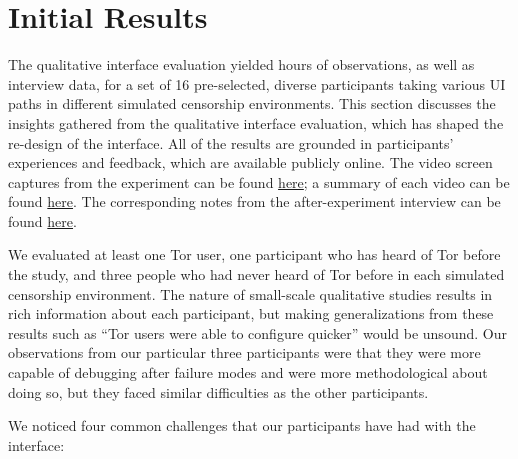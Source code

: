 \documentclass{template}
\begin{document}
\section{Initial Results}

The qualitative interface evaluation yielded hours of observations, as well as
interview data, for a set of 16 pre-selected, diverse participants taking
various UI paths in different simulated censorship environments. This section
discusses the insights gathered from the qualitative interface evaluation, which
has shaped the re-design of the interface. All of the results are grounded in
participants' experiences and feedback, which are available publicly online. The
video screen captures from the experiment can be found
\href{https://github.com/lindanlee/circumvention-ux-tor/tree/master/sessions/pre/videos}{here};
a summary of each video can be found
\href{https://github.com/lindanlee/circumvention-ux-tor/blob/master/sessions/pre/participant-summaries.txt}{here}.
The corresponding notes from the after-experiment interview can be found
\href{https://github.com/lindanlee/circumvention-ux-tor/tree/master/sessions/pre/notes}{here}. 

We evaluated at least one Tor user, one participant who has heard of Tor before the study, and three people who had never heard of Tor before in each simulated censorship environment. The nature of small-scale qualitative studies results in rich information about each participant, but making generalizations from these results such as ``Tor users were able to configure quicker'' would be unsound. Our observations from our particular three participants were that they were more capable of debugging after failure modes and were more methodological about doing so, but they faced similar difficulties as the other participants. 

We noticed four common challenges that our participants have had with the interface:  
\end{document}
